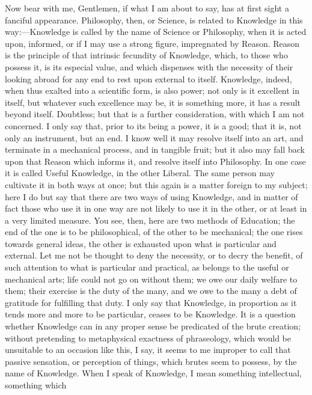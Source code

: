 Now bear with me, Gentlemen, if what I am about to say, has at
first sight a fanciful appearance. Philosophy, then, or Science, is
related to Knowledge in this way:—Knowledge is called by the name of
Science or Philosophy, when it is acted upon, informed, or if I may
use a strong figure, impregnated by Reason. Reason is the principle of
that intrinsic fecundity of Knowledge, which, to those who possess it,
is its especial value, and which dispenses with the necessity of their
looking abroad for any end to rest upon external to itself. Knowledge,
indeed, when thus exalted into a scientific form, is also power;
not only is it excellent in itself, but whatever such excellence may
be, it is something more, it has a result beyond itself. Doubtless;
but that is a further consideration, with which I am not concerned. I
only say that, prior to its being a power, it is a good; that it is,
not only an instrument, but an end. I know well it may resolve itself
into an art, and terminate in a mechanical process, and in tangible
fruit; but it also may fall back upon that Reason which informs it,
and resolve itself into Philosophy. In one case it is called Useful
Knowledge, in the other Liberal. The same person may cultivate it in
both ways at once; but this again is a matter foreign to my subject;
here I do but say that there are two ways of using Knowledge, and in
matter of fact those who use it in one way are not likely to use it in
the other, or at least in a very limited measure. You see, then, here
are two methods of Education; the end of the one is to be
philosophical, of the other to be mechanical; the one rises towards
general ideas, the other is exhausted upon what is particular and
external. Let me not be thought to deny the necessity, or to decry the
benefit, of such attention to what is particular and practical, as
belongs to the useful or mechanical arts; life could not go on without
them; we owe our daily welfare to them; their exercise is the duty of
the many, and we owe to the many a debt of gratitude for fulfilling
that duty. I only say that Knowledge, in proportion as it tends more
and more to be particular, ceases to be Knowledge. It is a question
whether Knowledge can in any proper sense be predicated of the brute
creation; without pretending to metaphysical exactness of phraseology,
which would be unsuitable to an occasion like this, I say, it seems to
me improper to call that passive sensation, or perception of things,
which brutes seem to possess, by the name of Knowledge. When I
speak of Knowledge, I mean something intellectual, something which
